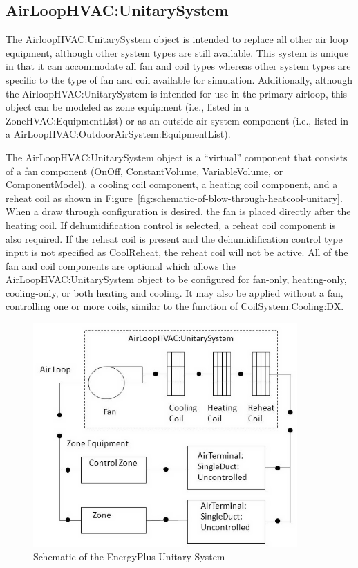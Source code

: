 \subsection{AirLoopHVAC:UnitarySystem}\label{airloophvacunitarysystem}

The AirloopHVAC:UnitarySystem object is intended to replace all other air loop equipment, although other system types are still available. This system is unique in that it can accommodate all fan and coil types whereas other system types are specific to the type of fan and coil available for simulation. Additionally, although the AirloopHVAC:UnitarySystem is intended for use in the primary airloop, this object can be modeled as zone equipment (i.e., listed in a ZoneHVAC:EquipmentList) or as an outside air system component (i.e., listed in a AirLoopHVAC:OutdoorAirSystem:EquipmentList).

The AirLoopHVAC:UnitarySystem object is a ``virtual'' component that consists of a fan component (OnOff, ConstantVolume, VariableVolume, or ComponentModel), a cooling coil component, a heating coil component, and a reheat coil as shown in Figure~\ref{fig:schematic-of-blow-through-heatcool-unitary}. When a draw through configuration is desired, the fan is placed directly after the heating coil. If dehumidification control is selected, a reheat coil component is also required. If the reheat coil is present and the dehumidification control type input is not specified as CoolReheat, the reheat coil will not be active. All of the fan and coil components are optional which allows the AirLoopHVAC:UnitarySystem object to be configured for fan-only, heating-only, cooling-only, or both heating and cooling. It may also be applied without a fan, controlling one or more coils, similar to the function of CoilSystem:Cooling:DX.

\begin{figure}[hbtp] %
\centering
\includegraphics[width=0.9\textwidth, height=0.9\textheight, keepaspectratio=true]{media/image294.png}
\caption{Schematic of the EnergyPlus Unitary System \protect \label{fig:schematic-of-the-energyplus-unitary-system}}
\end{figure}


